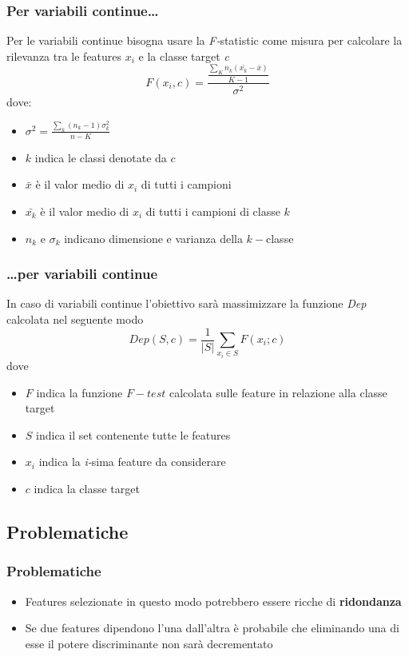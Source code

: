 \documentclass{beamer}
\begin{document}
\begin{frame}
	\frametitle{Per variabili continue\dots}
	Per le variabili continue bisogna usare la \emph{F-}statistic come misura per calcolare la rilevanza tra le features $x_i$ e la classe target \emph{c}
	$$ F(x_i,c) = \frac{\frac{\sum\limits_{K}{n_k(\bar{x_k}-\bar{x})}}{K-1}}{\sigma^2}$$
	dove: 
	\begin{itemize}
		\item $\sigma^2=\frac{ \sum\limits_{k}{(n_k-1)\sigma^2_k}}{n-K}$
		\item $k$ indica le classi denotate da $c$
		\item $\bar{x}$ è il valor medio di $x_i$ di tutti i campioni
		\item $\bar{x_k}$ è il valor medio di $x_i$ di tutti i campioni di classe $k$
		\item $n_k$ e $\sigma_k$ indicano dimensione e varianza della $k-$classe
	\end{itemize}
\end{frame}

\begin{frame}
	\frametitle{\dots per variabili continue}
	In caso di variabili continue l'obiettivo sarà massimizzare la funzione \emph{Dep} calcolata nel seguente modo
	$$Dep(S,c)= \frac{1}{|S|} \sum\limits_{x_i \in S} F(x_i;c)$$
	dove 
	\begin{itemize}
		\item $F$ indica la funzione $F-test$ calcolata sulle feature in relazione alla classe target
		\item $S$ indica il set contenente tutte le features
		\item $x_i$ indica la \emph{i-}sima feature da considerare
		\item $c$ indica la classe target
	\end{itemize}
\end{frame}

\subsection{Problematiche}
\begin{frame}
	\frametitle{Problematiche}
	\begin{itemize}
		\item Features selezionate in questo modo potrebbero essere ricche di \textbf{ridondanza}\newline
		\item Se due features dipendono l'una dall'altra è probabile che eliminando una di esse il potere discriminante non sarà decrementato
	\end{itemize}
\end{frame}
\end{document}
